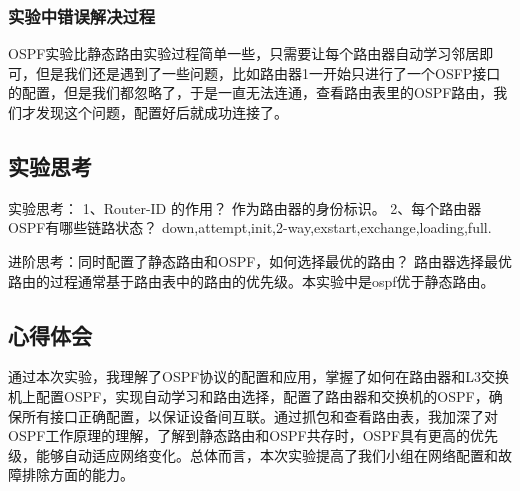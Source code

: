 \documentclass{article}
\begin{document}
\subsubsection{实验中错误解决过程}
OSPF实验比静态路由实验过程简单一些，只需要让每个路由器自动学习邻居即可，但是我们还是遇到了一些问题，比如路由器1一开始只进行了一个OSFP接口的配置，但是我们都忽略了，于是一直无法连通，查看路由表里的OSPF路由，我们才发现这个问题，配置好后就成功连接了。

\subsection{实验思考}
实验思考：
1、Router-ID 的作用？
作为路由器的身份标识。
2、每个路由器OSPF有哪些链路状态？
down,attempt,init,2-way,exstart,exchange,loading,full.

进阶思考：同时配置了静态路由和OSPF，如何选择最优的路由？
路由器选择最优路由的过程通常基于路由表中的路由的优先级。本实验中是ospf优于静态路由。

\subsection{心得体会}
通过本次实验，我理解了OSPF协议的配置和应用，掌握了如何在路由器和L3交换机上配置OSPF，实现自动学习和路由选择，配置了路由器和交换机的OSPF，确保所有接口正确配置，以保证设备间互联。通过抓包和查看路由表，我加深了对OSPF工作原理的理解，了解到静态路由和OSPF共存时，OSPF具有更高的优先级，能够自动适应网络变化。总体而言，本次实验提高了我们小组在网络配置和故障排除方面的能力。
\end{document}
